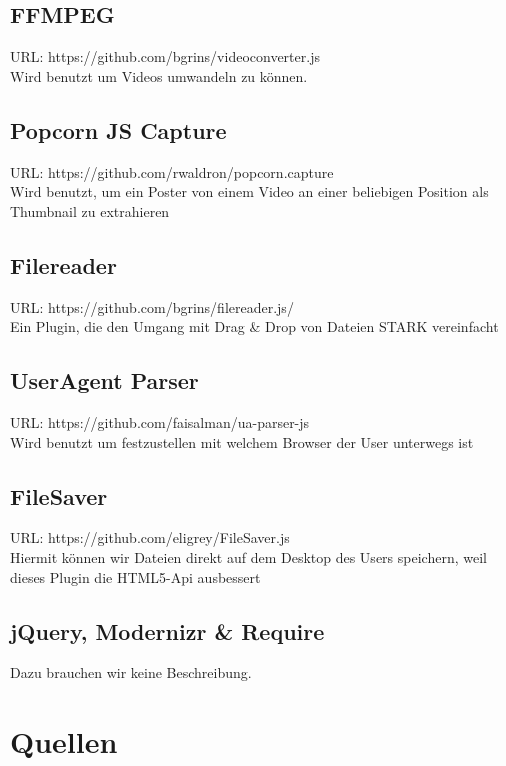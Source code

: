 \documentclass[a4paper,10pt]{scrartcl}
\begin{document}
\subsection{FFMPEG}
URL: https://github.com/bgrins/videoconverter.js\\
Wird benutzt um Videos umwandeln zu können.
\subsection{Popcorn JS Capture}
URL: https://github.com/rwaldron/popcorn.capture\\
Wird benutzt, um ein Poster von einem Video an einer beliebigen Position als Thumbnail zu extrahieren
\subsection{Filereader}
URL: https://github.com/bgrins/filereader.js/\\
Ein Plugin, die den Umgang mit Drag \& Drop von Dateien STARK vereinfacht
\subsection{UserAgent Parser}
URL: https://github.com/faisalman/ua-parser-js\\
Wird benutzt um festzustellen mit welchem Browser der User unterwegs ist
\subsection{FileSaver}
URL: https://github.com/eligrey/FileSaver.js\\
Hiermit können wir Dateien direkt auf dem Desktop des Users speichern, weil dieses Plugin die HTML5-Api ausbessert
\subsection{jQuery, Modernizr \& Require}
Dazu brauchen wir keine Beschreibung.

\newpage
\section{Quellen}
\end{document}
